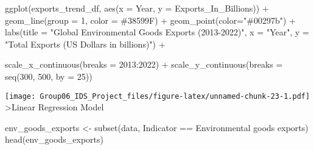 \documentclass[
]{article}
\newenvironment{Shaded}{\begin{snugshade}}{\end{snugshade}}
\newcommand{\AttributeTok}[1]{\textcolor[rgb]{0.77,0.63,0.00}{#1}}
\newcommand{\DecValTok}[1]{\textcolor[rgb]{0.00,0.00,0.81}{#1}}
\newcommand{\FunctionTok}[1]{\textcolor[rgb]{0.00,0.00,0.00}{#1}}
\newcommand{\NormalTok}[1]{#1}
\newcommand{\OtherTok}[1]{\textcolor[rgb]{0.56,0.35,0.01}{#1}}
\newcommand{\SpecialCharTok}[1]{\textcolor[rgb]{0.00,0.00,0.00}{#1}}
\newcommand{\StringTok}[1]{\textcolor[rgb]{0.31,0.60,0.02}{#1}}
\begin{document}
\begin{Shaded}
\begin{Highlighting}[]
\FunctionTok{ggplot}\NormalTok{(exports\_trend\_df, }\FunctionTok{aes}\NormalTok{(}\AttributeTok{x =}\NormalTok{ Year, }\AttributeTok{y =}\NormalTok{ Exports\_In\_Billions)) }\SpecialCharTok{+}
  \FunctionTok{geom\_line}\NormalTok{(}\AttributeTok{group =} \DecValTok{1}\NormalTok{, }\AttributeTok{color =} \StringTok{\textquotesingle{}\#38599F\textquotesingle{}}\NormalTok{) }\SpecialCharTok{+}
  \FunctionTok{geom\_point}\NormalTok{(}\AttributeTok{color=}\StringTok{"\#00297b"}\NormalTok{) }\SpecialCharTok{+}
  \FunctionTok{labs}\NormalTok{(}\AttributeTok{title =} \StringTok{"Global Environmental Goods Exports (2013{-}2022)"}\NormalTok{,}
       \AttributeTok{x =} \StringTok{"Year"}\NormalTok{,}
       \AttributeTok{y =} \StringTok{"Total Exports (US Dollars in billions)"}\NormalTok{) }\SpecialCharTok{+}
  
  \FunctionTok{scale\_x\_continuous}\NormalTok{(}\AttributeTok{breaks =} \DecValTok{2013}\SpecialCharTok{:}\DecValTok{2022}\NormalTok{) }\SpecialCharTok{+}
  \FunctionTok{scale\_y\_continuous}\NormalTok{(}\AttributeTok{breaks =} \FunctionTok{seq}\NormalTok{(}\DecValTok{300}\NormalTok{, }\DecValTok{500}\NormalTok{, }\AttributeTok{by =} \DecValTok{25}\NormalTok{))}
\end{Highlighting}
\end{Shaded}

\texttt{[image: Group06\_IDS\_Project\_files/figure-latex/unnamed-chunk-23-1.pdf]}
\textgreater Linear Regression Model

\begin{Shaded}
\begin{Highlighting}[]
\NormalTok{env\_goods\_exports }\OtherTok{\textless{}{-}} \FunctionTok{subset}\NormalTok{(data, Indicator }\SpecialCharTok{==} \StringTok{\textquotesingle{}Environmental goods exports\textquotesingle{}}\NormalTok{)}
\FunctionTok{head}\NormalTok{(env\_goods\_exports)}
\end{Highlighting}
\end{Shaded}
\end{document}
